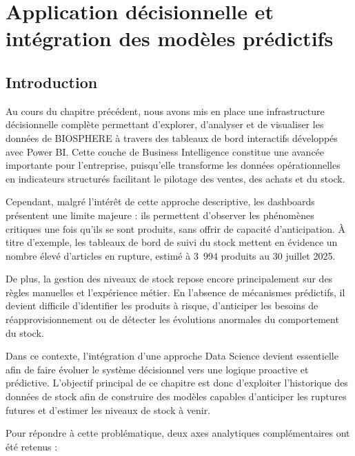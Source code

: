 ﻿\newpage
\pagestyle{fancy}
\renewcommand{\headrulewidth}{0.5pt}
\renewcommand{\footrulewidth}{0.5pt}
 
\chapter{Application décisionnelle et intégration des modèles prédictifs}\setlength{\headheight}{28pt}
\label{ch4}
\minitoc
\newpage
 
\section{Introduction}
 
Au cours du chapitre précédent, nous avons mis en place une infrastructure décisionnelle complète permettant d'explorer, d'analyser et de visualiser les données de BIOSPHERE à travers des tableaux de bord interactifs développés avec Power BI. Cette couche de Business Intelligence constitue une avancée importante pour l'entreprise, puisqu'elle transforme les données opérationnelles en indicateurs structurés facilitant le pilotage des ventes, des achats et du stock.
 
Cependant, malgré l'intérêt de cette approche descriptive, les dashboards présentent une limite majeure : ils permettent d'observer les phénomènes critiques une fois qu'ils se sont produits, sans offrir de capacité d'anticipation. À titre d'exemple, les tableaux de bord de suivi du stock mettent en évidence un nombre élevé d'articles en rupture, estimé à 3~994 produits au 30 juillet 2025. 
 
De plus, la gestion des niveaux de stock repose encore principalement sur des règles manuelles et l'expérience métier. En l'absence de mécanismes prédictifs, il devient difficile d'identifier les produits à risque, d'anticiper les besoins de réapprovisionnement ou de détecter les évolutions anormales du comportement du stock.
 
Dans ce contexte, l'intégration d'une approche Data Science devient essentielle afin de faire évoluer le système décisionnel vers une logique proactive et prédictive. L'objectif principal de ce chapitre est donc d'exploiter l'historique des données de stock afin de construire des modèles capables d'anticiper les ruptures futures et d'estimer les niveaux de stock à venir.
 
Pour répondre à cette problématique, deux axes analytiques complémentaires ont été retenus :
 
